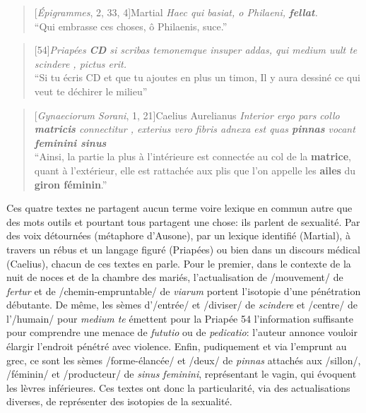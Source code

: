 \begin{quote}[\textit{Épigrammes}, 2, 33, 4]{Martial}
    \textit{Haec qui basiat, o Philaeni, \textbf{fellat}. \\}
    \enquote{Qui embrasse ces choses, ô Philaenis, suce.}
\end{quote}

\begin{quote}[54]{\textit{Priapées}}
    \textit{\textbf{CD} si scribas temonemque insuper addas, qui medium uult te scindere , pictus erit.} \\
    \enquote{Si tu écris CD et que tu ajoutes en plus un timon, Il y aura dessiné ce qui veut te déchirer le milieu}
\end{quote}

\begin{quote}[\textit{Gynaeciorum Sorani}, 1, 21]{Caelius Aurelianus}
    \textit{Interior ergo pars collo \textbf{matricis} connectitur , exterius vero fibris adnexa est quas \textbf{pinnas} vocant \textbf{feminini sinus}} \\
    \enquote{Ainsi, la partie la plus à l'intérieure est connectée au col de la \textbf{matrice}, quant à l'extérieur, elle est rattachée aux plis que l'on appelle les \textbf{ailes} du \textbf{giron féminin}.}
\end{quote}

Ces quatre textes ne partagent aucun terme voire lexique en commun autre que des mots outils et pourtant tous partagent une chose: ils parlent de sexualité. Par des voix détournées (métaphore d'Ausone), par un lexique identifié (Martial), à travers un rébus et un langage figuré (Priapées) ou bien dans un discours médical (Caelius), chacun de ces textes en parle. Pour le premier, dans le contexte de la nuit de noces et de la chambre des mariés, l'actualisation de /mouvement/ de \textit{fertur} et de /chemin-empruntable/ de \textit{viarum} portent l'isotopie d'une pénétration débutante. De même, les sèmes d'/entrée/ et /diviser/ de \textit{scindere} et /centre/ de l'/humain/ pour \textit{medium te} émettent pour la Priapée 54 l'information suffisante pour comprendre une menace de \textit{fututio} ou de \textit{pedicatio}: l'auteur annonce vouloir élargir l'endroit pénétré avec violence. Enfin, pudiquement et via l'emprunt au grec, ce sont les sèmes /forme-élancée/ et /deux/ de \textit{pinnas} attachés aux /sillon/, /féminin/ et /producteur/ de \textit{sinus feminini}, représentant le vagin, qui évoquent les lèvres inférieures. Ces textes ont donc la particularité, via des actualisations diverses, de représenter des isotopies de la sexualité.

